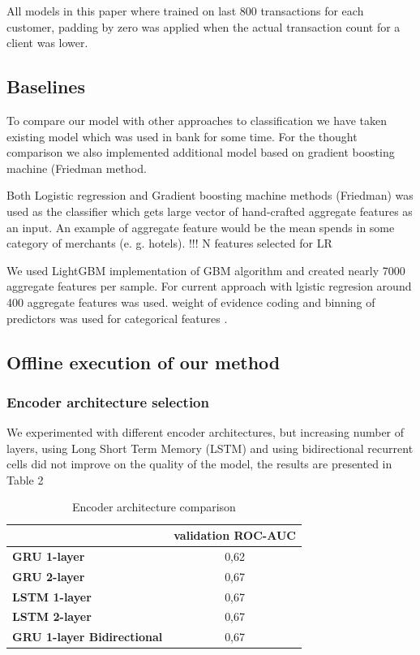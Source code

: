\documentclass{sigkddExp}
\begin{document}
All models in this paper where trained on last 800 transactions for each customer, padding by zero was applied when the actual transaction count for a client was lower.

\subsection{Baselines}

To compare our model with other approaches to classification we have taken existing model which was used in bank for some time. For the thought comparison we also implemented additional model based on gradient boosting machine (Friedman\cite{friedman2001greedy} method.

Both Logistic regression and Gradient boosting machine methods (Friedman\cite{friedman2001greedy}) was used as the classifier which gets large vector of hand-crafted aggregate features as an input. An example of aggregate feature would be the mean spends in some category of merchants (e. g. hotels). !!! N features selected for LR

We used LightGBM\cite{Ke2017LightGBMAH} implementation of GBM algorithm and created nearly 7000 aggregate features per sample. For current approach with lgistic regresion around 400 aggregate features was used. weight of evidence coding and binning of predictors was used for categorical features
\cite{lund2016woe}. 

\subsection{Offline execution of our method}

\subsubsection{Encoder architecture selection}

We experimented with different encoder architectures, but increasing number of layers, using Long Short Term Memory (LSTM) and using bidirectional recurrent cells did not improve on the quality of the model, the results are presented in Table 2

\begin{table}[h]
\caption{Encoder architecture comparison}
\begin{tabular}{ | l | c |  }
\hline
& \textbf{validation ROC-AUC} \\
\hline
\textbf{GRU 1-layer} & 0,62  \\
\textbf{GRU 2-layer} & 0,67  \\
\textbf{LSTM 1-layer} & 0,67  \\
\textbf{LSTM 2-layer} & 0,67  \\
\textbf{GRU 1-layer Bidirectional} & 0,67  \\
\hline
\end{tabular}
\label{tab3}
\end{table}
\end{document}
